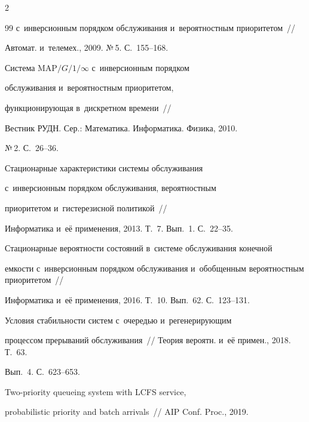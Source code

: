 \begin{multicols}{2}
{{\begin{thebibliography}{99}
с~инверсионным порядком обслуживания и~вероятностным приоритетом~// 

Автомат. и~телемех., 2009. №\,5. С.~155--168.







Система $\mathrm{MAP}/G/1/\infty$ с~инверсионным порядком

обслуживания и~вероятностным приоритетом,

функционирующая в~дискретном времени~//

Вестник РУДН. Сер.: Математика. Информатика. Физика, 2010.

№\,2. С.~26--36.





Стационарные характеристики системы обслуживания 

с~инверсионным порядком обслуживания, вероятностным

приоритетом и~гистерезисной политикой~//

Информатика и~её применения, 2013. Т.~7. Вып.~1. С.~22--35.





Стационарные вероятности состояний в~системе обслуживания конечной 

емкости с~инверсионным порядком обслуживания и~обобщенным вероятностным приоритетом~// 

Информатика и~её применения, 2016. Т.~10. Вып.~62. С.~123--131.





Условия ста\-биль\-ности систем с~очередью и~регенерирующим 

процессом прерываний обслуживания~// Теория вероятн. и~её примен., 2018. Т.~63. 

Вып.~4. С.~623--653.




 Two-priority queueing system with LCFS service, 

probabilistic priority and batch arrivals~// AIP Conf. Proc., 2019. 


\end{thebibliography}}}
\end{multicols}
